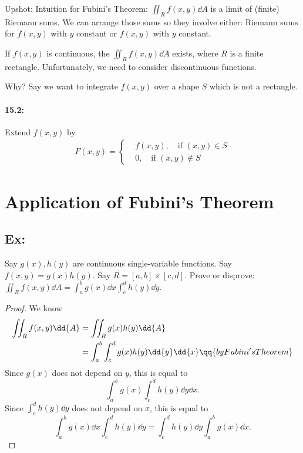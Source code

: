 Upshot: Intuition for Fubini's Theorem: $\iint_R f(x,y) \dd{A}$ is a limit of
(finite) Riemann sums. We can arrange those sums so they involve either:
Riemann sums for $f(x,y)$ with $y$ constant or $f(x,y)$ with $y$ constant.

\begin{theorem}
  If $f(x,y)$ is continuous, the $\iint_R f(x,y)\dd{A}$ exists, where $R$ is a
  finite rectangle. Unfortunately, we need to consider discontinuous functions.
\end{theorem}
Why? Say we want to integrate $f(x,y)$ over a shape $S$ which is not a
rectangle.
\paragraph{15.2:} Extend $f(x,y)$ by
\begin{align*}
  F(x,y) = \begin{cases}
    &f(x,y),\quad\text{if } (x,y)\in S \\
    &0,\quad\text{if } (x,y)\not\in S
  \end{cases}
\end{align*}

\section{Application of Fubini's Theorem}
\subsection{Ex:}
Say $g(x),h(y)$ are continuous single-variable functions. Say
$f(x,y)=g(x)h(y)$. Say $R=[a,b]\times[c,d]$. Prove or disprove: $\iint_R f(x,y)
\dd{A} = \int_a^bg(x)\dd{x} \int_c^dh(y)\dd{y}$.

\begin{proof}
  We know
  \begin{align*}
    \iint_R f(x,y) \dd{A} &= \iint_R g(x)h(y) \dd{A} \\
    &=\int_a^b\int_c^d g(x)h(y)\dd{y}\dd{x}\qq{by Fubini's Theorem}
  \end{align*}
  Since $g(x)$ does not depend on $y$, this is equal to
  \[
    \int_a^b g(x)\int_c^dh(y)\dd{y}\dd{x}.
  \]
  Since $\int_c^d h(y)\dd{y}$ does not depend on $x$, this is equal to
  \[
    \int_a^bg(x)\dd{x} \int_c^dh(y)\dd{y} =
    \int_c^dh(y)\dd{y}\int_a^bg(x)\dd{x}.
  \]
\end{proof}

